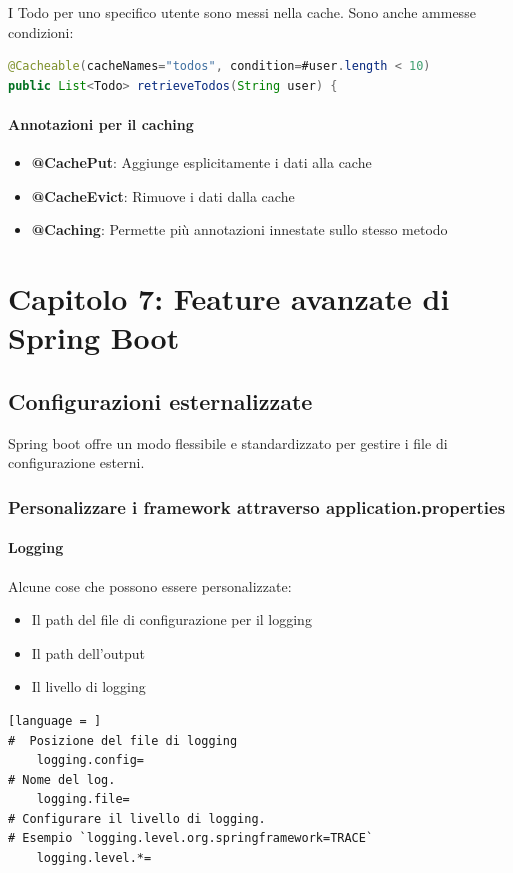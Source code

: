 \documentclass[11pt,a4paper]{book}
\begin{document}
I Todo per uno specifico utente sono messi nella cache. Sono anche ammesse condizioni:
\begin{lstlisting}[language = Java]
@Cacheable(cacheNames="todos", condition=#user.length < 10)
public List<Todo> retrieveTodos(String user) {
\end{lstlisting}

\paragraph{Annotazioni per il caching}
\begin{itemize}
	\item \textbf{@CachePut}: Aggiunge esplicitamente i dati alla cache
	\item \textbf{@CacheEvict}: Rimuove i dati dalla cache
	\item \textbf{@Caching}: Permette più annotazioni innestate sullo stesso metodo
\end{itemize}

\section{Capitolo 7: Feature avanzate di Spring Boot}
\subsection{Configurazioni esternalizzate}
Spring boot offre un modo flessibile e standardizzato per gestire i file di configurazione esterni.

\subsubsection{Personalizzare i framework attraverso application.properties}
\paragraph{Logging}
Alcune cose che possono essere personalizzate:
\begin{itemize}
	\item Il path del file di configurazione per il logging
	\item Il path dell'output
	\item Il livello di logging
\end{itemize}

\begin{lstlisting}[language = ]
#  Posizione del file di logging
	logging.config=
# Nome del log.
	logging.file=
# Configurare il livello di logging.
# Esempio `logging.level.org.springframework=TRACE`
	logging.level.*=
\end{lstlisting}
\end{document}
